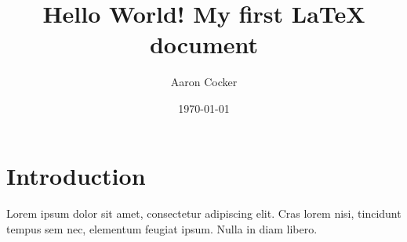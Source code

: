 \documentclass[a4paper,12pt]{article}
\begin{document}
\title{Hello World! My first LaTeX document}
\author{Aaron Cocker}
\date{\today}
\maketitle

\section{Introduction}

\paragraph{}
Lorem ipsum dolor sit amet, consectetur adipiscing elit. Cras lorem nisi, tincidunt tempus sem nec, elementum feugiat ipsum. Nulla in diam libero. 
\end{document}
